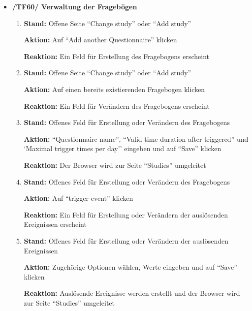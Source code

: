 \documentclass[a4paper]{scrreprt}
\begin{document}
\begin{itemize}
                \item \textbf{/TF60/ Verwaltung der Frageb\"ogen}
                    \begin{enumerate}
                        \item \par \textbf{Stand: }Offene Seite ``Change study'' oder ``Add study''
                              \par \textbf{Aktion: }Auf ``Add another Questionnaire'' klicken
                              \par \textbf{Reaktion: }Ein Feld f\"ur Erstellung des Fragebogens erscheint
						\item \par \textbf{Stand: }Offene Seite ``Change study'' oder ``Add study''
                              \par \textbf{Aktion: }Auf einen bereits existierenden Fragebogen klicken
                              \par \textbf{Reaktion: }Ein Feld f\"ur Ver\"andern des Fragebogens erscheint                              
                        \item \par \textbf{Stand: }Offenes Feld f\"ur Erstellung oder Ver\"andern des Fragebogens
                              \par \textbf{Aktion: }``Questionnaire name'', ``Valid time duration after triggered'' und `Maximal trigger times per day'' eingeben und auf ``Save'' klicken
                              \par \textbf{Reaktion: }Der Browser wird zur Seite ``Studies'' umgeleitet   
                        \item \par \textbf{Stand: }Offenes Feld f\"ur Erstellung oder Ver\"andern des Fragebogens
                              \par \textbf{Aktion: }Auf ``trigger event'' klicken
                              \par \textbf{Reaktion: }Ein Feld f\"ur Erstellung oder Ver\"andern der ausl\"osenden Ereignissen erscheint  
                        \item \par \textbf{Stand: }Offenes Feld f\"ur Erstellung oder Ver\"andern der ausl\"osenden Ereignissen
                              \par \textbf{Aktion: }Zugeh\"orige Optionen w\"ahlen, Werte eingeben und auf ``Save'' klicken
                              \par \textbf{Reaktion: }Ausl\"osende Ereignisse werden erstellt und der Browser wird zur Seite ``Studies'' umgeleitet    

\end{enumerate}
\end{itemize}
\end{document}
